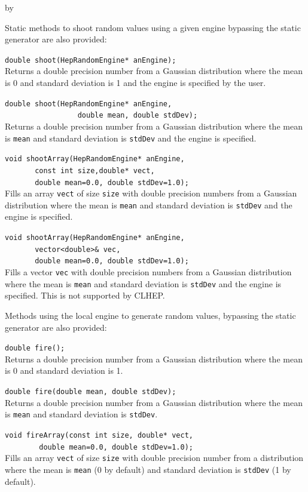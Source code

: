 \documentclass[twoside]{article}
\newcommand{\comp}[1]{\texttt{#1}}%
\newcommand{\entrylabel}[1]{\mbox{\textbf{{#1}}}\hfil}%
\newenvironment{entry}
{\begin{list}{}%
    {\renewcommand{\makelabel}{\entrylabel}%
     \setlength{\labelwidth}{90pt}%
     \setlength{\leftmargin}{\labelwidth}
     \advance\leftmargin by \labelsep%
      }%
    }%
  {\end{list}}
\newcommand{\Entrylabel}[1]%
{\raisebox{0pt}[1ex][0pt]{\makebox[\labelwidth][l]%
    {\parbox[t]{\labelwidth}{\hspace{0pt}\textbf{{#1}}}}}}
\newenvironment{Entry}%
{\renewcommand{\entrylabel}{\Entrylabel}\begin{entry}}%
  {\end{entry}}
\begin{document}
\begin{description}
\begin{Entry}
  Static methods to shoot random values using a given engine
  bypassing the static generator are also provided:

  \verb+double shoot(HepRandomEngine* anEngine);+\\
  Returns a double precision number from a Gaussian distribution where the
  mean is 0 and standard deviation is 1
  and the engine is specified by the user.
  
  \verb+double shoot(HepRandomEngine* anEngine,+\\ 
  \verb+                 double mean, double stdDev);+\\
  Returns a double precision number from a Gaussian distribution where the
  mean is \comp{mean} and standard deviation is \comp{stdDev}
  and the engine is specified.

  \verb+void shootArray(HepRandomEngine* anEngine,+\\
  \verb+       const int size,double* vect,+\\ 
  \verb+       double mean=0.0, double stdDev=1.0);+\\
  Fills an array \comp{vect} of size \comp{size} with double precision
  numbers from a Gaussian distribution where the
  mean is \comp{mean} and standard deviation is \comp{stdDev}
  and the engine is specified.

  \verb+void shootArray(HepRandomEngine* anEngine,+\\
  \verb+       vector<double>& vec,+\\ 
  \verb+       double mean=0.0, double stdDev=1.0);+\\
  Fills a vector \comp{vec} with double precision
  numbers from a Gaussian distribution where the
  mean is \comp{mean} and standard deviation is \comp{stdDev}
  and the engine is specified.  This is not supported by CLHEP.
  
  Methods using the local engine to generate random values, bypassing
  the static generator are also provided:

  \verb+double fire();+\\
  Returns a double precision number from a Gaussian distribution where the
  mean is 0 and standard deviation is 1.
  
  \verb+double fire(double mean, double stdDev);+\\
  Returns a double precision number from a Gaussian distribution where the
  mean is \comp{mean} and standard deviation is \comp{stdDev}.
  
  \verb+void fireArray(const int size, double* vect,+\\
  \verb+        double mean=0.0, double stdDev=1.0);+\\
  Fills an array \comp{vect} of size \comp{size} with double
  precision number from a distribution where the
  mean is \comp{mean} (0 by default) and standard
  deviation is \comp{stdDev} (1 by default).


\end{Entry}
\end{description}
\end{document}
